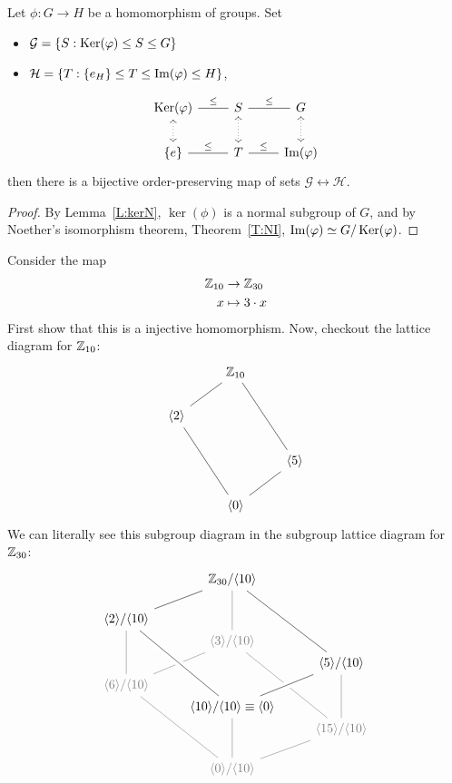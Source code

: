 \documentclass{ximera}
\begin{document}
\begin{corollary}
  Let $\phi:G\to H$ be a homomorphism of groups. Set
  \begin{itemize}
  \item $\mathcal{G} = \{S:\mathop{\mathrm{Ker}}\nolimits(\varphi)\leq S\leq G\}$
  \item $\mathcal{H} = \{T:\{e_H\}\leq T\leq \operatorname{Im}(\varphi)\leq H\}$,
  \end{itemize}
  \[
  \begin{tikzcd}
    \ker(\phi) \ar[r,-,"\subgp"] \ar[d,<->,dotted]& S\ar[r,-,"\subgp"] \ar[d,<->,dotted]& G \ar[d,<->,dotted]\\
    \{e\} \ar[r,-,"\subgp"] & T \ar[r,-,"\subgp"] & \im(\phi)
  \end{tikzcd}
  \]
  then there is a bijective order-preserving map of sets
  $\mathcal{G}\leftrightarrow\mathcal{H}$.
  \begin{proof}
    By Lemma~\ref{L:kerN}, $\ker(\phi)$ is a normal subgroup of $G$,
    and by Noether's isomorphism theorem, Theorem~\ref{T:NI},
    $\operatorname{Im}(\varphi)\simeq G/\mathop{\mathrm{Ker}}\nolimits(\varphi)$.
  \end{proof}
\end{corollary}

\begin{example}
  Consider the map
  \begin{align*}
    \mathbb Z_{10} &\to \mathbb Z_{30}\\
    x &\mapsto 3\cdot x
  \end{align*}
  First show that this is a injective homomorphism. Now, checkout the
  lattice diagram for $\mathbb Z_{10}$:
  \[
  \begin{tikzcd}
    & \Z_{10} \ar[ld,-]  \ar[rdd,-] &       \\
    \< 2\> \ar[rdd,-]&       &       \\
    &       & \<5\> \ar[ld,-]\\
    & \<0\> &
  \end{tikzcd}
  \]
  We can literally see this subgroup diagram in the subgroup lattice
  diagram for $\mathbb Z_{30}$:
  \[
  \begin{tikzcd}[row sep=0in]
    & \Z_{30}/\<10\>\ar[ldd,-]  \ar[white!50!black,ddd,-] \ar[rdddd,-] &       \\
    &\phantom{MM} & \\
    \<2\> /\<10\> \ar[white!50!black,ddd,-] &   &  \\
    & \color{white!50!black}\<3\>/\<10\>\ar[white!50!black,ldd,-]\ar[white!50!black,rdddd,-] & \\
    &  &  \<5\> /\<10\>\ar[white!50!black,ddd,-]\\
     \color{white!50!black}\<6\>/\<10\>\ar[white!50!black,rdddd,-]& & \\
    &\<10\>/\<10\> \equiv \<0\> \ar[white!50!black,ddd,-]\ar[ruu,-,white,line width=2mm]\ar[ruu,-]\ar[luuuu,-,white,line width=2mm]\ar[luuuu,-] & \\
    & & \color{white!50!black} \<15\>/\<10\>\ar[white!50!black,ldd,-]\\
    &\phantom{MM} & \\
    &  \color{white!50!black}\<0\>/\<10\> &
  \end{tikzcd}
  \]
\end{example}
\end{document}
